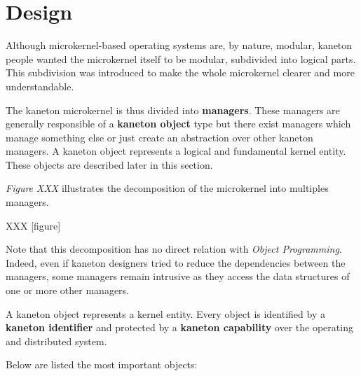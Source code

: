 %
%

\section{Design}

Although microkernel-based operating systems are, by nature, modular, kaneton
people wanted the microkernel itself to be modular, subdivided into logical
parts. This subdivision was introduced to make the whole microkernel clearer
and more understandable.

The kaneton microkernel is thus divided into \textbf{managers}. These
managers are generally responsible of a \textbf{kaneton object} type but there
exist managers which manage something else or just create an abstraction over
other kaneton managers. A kaneton object represents a logical and fundamental
kernel entity. These objects are described later in this section.

\textit{Figure XXX} illustrates the decomposition of the microkernel into
multiples managers.

XXX [figure]

Note that this decomposition has no direct relation with \textit{Object
Programming}. Indeed, even if kaneton designers tried to reduce the
dependencies between the managers, some managers remain intrusive as they
access the data structures of one or more other managers.

A kaneton object represents a kernel entity. Every object is identified by
a \textbf{kaneton identifier} and protected by a \textbf{kaneton capability}
over the operating and distributed system.

Below are listed the most important objects:

